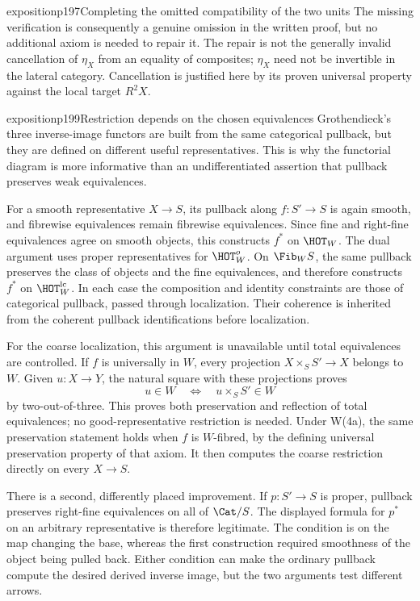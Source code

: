 \begin{dcomment}{exposition}{p197}{Completing the omitted compatibility of the two units}
The missing verification is consequently a genuine omission in the written proof, but no additional axiom is needed to repair it. The repair is not the generally invalid cancellation of $\eta_X$ from an equality of composites; $\eta_X$ need not be invertible in the lateral category. Cancellation is justified here by its proven universal property against the local target $R^2X$.
\end{dcomment}

\begin{dcomment}{exposition}{p199}{Restriction depends on the chosen equivalences}
Grothendieck's three inverse-image functors are built from the same categorical pullback, but they are defined on different useful representatives. This is why the functorial diagram is more informative than an undifferentiated assertion that pullback preserves weak equivalences.

For a smooth representative $X\to S$, its pullback along $f:S'\to S$ is again smooth, and fibrewise equivalences remain fibrewise equivalences. Since fine and right-fine equivalences agree on smooth objects, this constructs $f^*$ on $\HOT_W$. The dual argument uses proper representatives for $\HOT_W^o$. On $\Fib_W S$, the same pullback preserves the class of objects and the fine equivalences, and therefore constructs $f^*$ on $\HOT_W^{\mathrm{lc}}$. In each case the composition and identity constraints are those of categorical pullback, passed through localization. Their coherence is inherited from the coherent pullback identifications before localization.

For the coarse localization, this argument is unavailable until total equivalences are controlled. If $f$ is universally in $W$, every projection $X\times_S S'\to X$ belongs to $W$. Given $u:X\to Y$, the natural square with these projections proves
\[
 u\in W\quad\Longleftrightarrow\quad
 u\times_S S'\in W
\]
by two-out-of-three. This proves both preservation and reflection of total equivalences; no good-representative restriction is needed. Under W(4a), the same preservation statement holds when $f$ is $W$-fibred, by the defining universal preservation property of that axiom. It then computes the coarse restriction directly on every $X\to S$.

There is a second, differently placed improvement. If $p:S'\to S$ is proper, pullback preserves right-fine equivalences on all of $\Cat/S$. The displayed formula for $p^*$ on an arbitrary representative is therefore legitimate. The condition is on the map changing the base, whereas the first construction required smoothness of the object being pulled back. Either condition can make the ordinary pullback compute the desired derived inverse image, but the two arguments test different arrows.


\end{dcomment}
